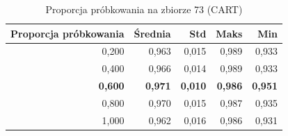 \begin{table}[htbp]
\centering
\small
\setlength{\tabcolsep}{6pt}
\renewcommand{\arraystretch}{1.2}
\caption{Proporcja próbkowania na zbiorze 73 (CART)}
\label{tab:CART_sample_ratio_73}
\begin{tabular}{r|r|r|r|r}
\toprule
Proporcja próbkowania & Średnia & Std & Maks & Min \\
\hline
0,200 & 0,963 & 0,015 & 0,989 & 0,933 \\
0,400 & 0,966 & 0,014 & 0,989 & 0,933 \\
\textbf{0,600} & \textbf{0,971} & \textbf{0,010} & \textbf{0,986} & \textbf{0,951} \\
0,800 & 0,970 & 0,015 & 0,987 & 0,935 \\
1,000 & 0,962 & 0,016 & 0,986 & 0,931 \\
\bottomrule
\end{tabular}
\end{table}